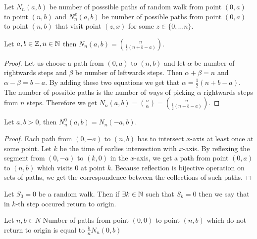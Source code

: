 \begin{defn}
  Let $N_n(a,b)$ be number of posssible paths of random walk \rw from point $(0,a)$ to point $(n,b)$ and $N_n^x(a,b)$ be number of possible paths from point $(0,a)$ to point $(n,b)$ that visit point $(z,x)$ for some $z \in \{0, \ldots n \}$.
\end{defn}
\begin{thm}\label{thm-num_of_paths}
  Let $a,b \in \mathbb{Z}, n \in \mathbb{N}$ then $N_n(a,b)=\binom{n}{\frac{1}{2}(n+b-a)}.$
\end{thm}
\begin{proof}
  Let us choose a path from $(0,a)$ to $(n,b)$ and let $\alpha$ be number of rightwards steps and $\beta$ be number of leftwards steps. Then $\alpha+\beta=n$ and $\alpha-\beta=b-a$. By adding these two equations we get that $\alpha=\frac{1}{2}(n+b-a)$. The number of possible paths is the number of ways of picking $\alpha$ rightwards steps from $n$ steps. Therefore we get $N_n(a,b)=\binom{n}{\alpha}=\binom{n}{\frac{1}{2}(n+b-a)}.$
\end{proof}
\begin{thm}\label{thm-reflection}
  Let $a,b >0$, then $N_n^0(a,b)=N_n(-a,b)$.
\end{thm}
\begin{proof}
  Each path from $(0,-a)$ to $(n,b)$ has to intersect $x$-axis at least once at some point. Let $k$ be the time of earlies intersection with $x$-axis. By reflexing the segment from $(0,-a)$ to $(k,0)$ in the $x$-axis, we get a path from point $(0,a)$ to $(n,b)$ which visits $0$ at point $k$. Because reflection is bijective operation on sets of paths, we get the correspondence between the collections of such paths.
\end{proof}
\begin{defn}
  Let $S_0=0$ \rw be a random walk. Then if $\exists k \in \mathbb{N}$ such that $S_k=0$ then we say that in $k$-th step occured return to origin.
\end{defn}
\begin{thm}\label{thm-ballot}
  Let $n,b \in N$
  Number of paths from point $(0,0)$ to point $(n,b)$ which do not return to origin is equal to $\frac{b}{n}N_n(0,b)$
\end{thm}
